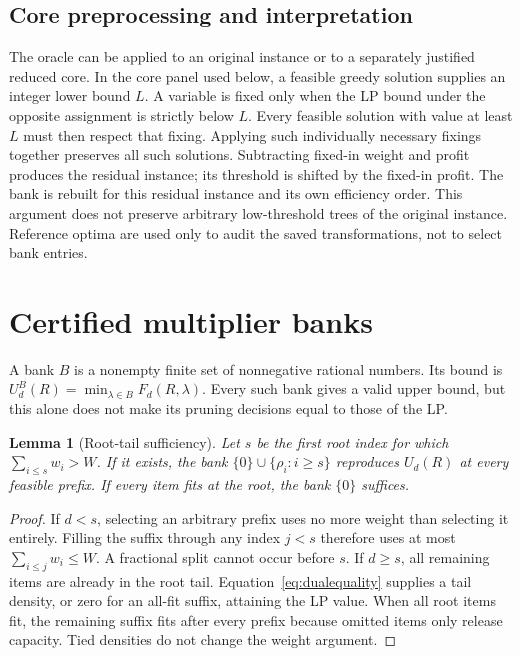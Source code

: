 \documentclass[referee,pdflatex,sn-mathphys-num]{sn-jnl}
\theoremstyle{thmstyleone}
\newtheorem{lemma}[theorem]{Lemma}
\theoremstyle{thmstyletwo}
\begin{document}
\subsection{Core preprocessing and interpretation}
The oracle can be applied to an original instance or to a separately justified reduced core. In the core panel used below, a feasible greedy solution supplies an integer lower bound $L$. A variable is fixed only when the LP bound under the opposite assignment is strictly below $L$. Every feasible solution with value at least $L$ must then respect that fixing. Applying such individually necessary fixings together preserves all such solutions. Subtracting fixed-in weight and profit produces the residual instance; its threshold is shifted by the fixed-in profit. The bank is rebuilt for this residual instance and its own efficiency order. This argument does not preserve arbitrary low-threshold trees of the original instance. Reference optima are used only to audit the saved transformations, not to select bank entries.

\section{Certified multiplier banks}\label{sec:bank}
A bank $B$ is a nonempty finite set of nonnegative rational numbers. Its bound is $U^B_d(R)=\min_{\lambda\in B}F_d(R,\lambda)$. Every such bank gives a valid upper bound, but this alone does not make its pruning decisions equal to those of the LP.

\begin{lemma}[Root-tail sufficiency]\label{lem:tail}
Let $s$ be the first root index for which $\sum_{i\leq s}w_i>W$. If it exists, the bank $\{0\}\cup\{\rho_i:i\geq s\}$ reproduces $U_d(R)$ at every feasible prefix. If every item fits at the root, the bank $\{0\}$ suffices.
\end{lemma}
\begin{proof}
If $d<s$, selecting an arbitrary prefix uses no more weight than selecting it entirely. Filling the suffix through any index $j<s$ therefore uses at most $\sum_{i\leq j}w_i\leq W$. A fractional split cannot occur before $s$. If $d\geq s$, all remaining items are already in the root tail. Equation~\eqref{eq:dualequality} supplies a tail density, or zero for an all-fit suffix, attaining the LP value. When all root items fit, the remaining suffix fits after every prefix because omitted items only release capacity. Tied densities do not change the weight argument.
\end{proof}
\end{document}
